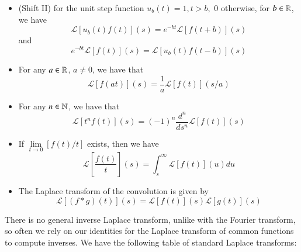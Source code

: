 \documentclass[12pt, a4paper, oneside, openright, titlepage]{book}
\begin{document}
\begin{props}
\begin{itemize}
\begin{equation}
            \end{equation}
        \item (Shift II) for the unit step function $u_b(t) = 1, t > b,$ $0$ otherwise, for $b \in \mathbb R$, we have \begin{equation}
                \mathcal{L}[u_b(t)f(t)](s) = e^{-bt}\mathcal{L}[f(t+b)](s)
        \end{equation}
            and \begin{equation}
                e^{-bt}\mathcal{L}[f(t)](s) = \mathcal{L}[u_b(t)f(t-b)](s)
            \end{equation}
        \item For any $a \in \mathbb R$, $a \neq 0$, we have that \begin{equation}
                \mathcal{L}[f(at)](s) = \frac{1}{a}\mathcal{L}[f(t)](s/a)
            \end{equation}
        \item For any $n \in \mathbb N$, we have that \begin{equation}
                \mathcal{L}[t^nf(t)](s) = (-1)^n\frac{d^n}{ds^n}\mathcal{L}[f(t)](s)
            \end{equation}
        \item If $\lim\limits_{t\rightarrow 0} [f(t)/t]$ exists, then we have \begin{equation}
                \mathcal{L}\left[\frac{f(t)}{t}\right](s) = \int_s^{\infty}\mathcal{L}[f(t)](u)du
            \end{equation}
        \item The Laplace transform of the convolution is given by \begin{equation}
                \mathcal{L}[(f*g)(t)](s) = \mathcal{L}[f(t)](s)\mathcal{L}[g(t)](s)
        \end{equation}
    \end{itemize}
\end{props}

There is no general inverse Laplace transform, unlike with the Fourier transform, so often we rely on our identities for the Laplace transform of common functions to compute inverses. We have the following table of standard Laplace transforms:
\end{document}
